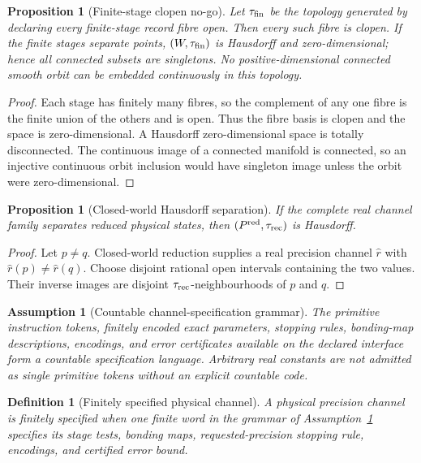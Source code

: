 \documentclass[11pt]{article}
\newtheorem{proposition}[theorem]{Proposition}
\newtheorem{definition}[theorem]{Definition}
\newtheorem{assumption}[theorem]{Assumption}
\theoremstyle{remark}
\begin{document}
\begin{proposition}[Finite-stage clopen no-go]
\label{prop:finite-stage-clopen-no-go}
Let $\tau_{\rm fin}$ be the topology generated by declaring every finite-stage
record fibre open.  Then every such fibre is clopen.  If the finite stages
separate points, $(W,\tau_{\rm fin})$ is Hausdorff and zero-dimensional; hence
all connected subsets are singletons.  No positive-dimensional connected
smooth orbit can be embedded continuously in this topology.
\end{proposition}

\begin{proof}
Each stage has finitely many fibres, so the complement of any one fibre is the
finite union of the others and is open.  Thus the fibre basis is clopen and the
space is zero-dimensional.  A Hausdorff zero-dimensional space is totally
disconnected.  The continuous image of a connected manifold is connected, so
an injective continuous orbit inclusion would have singleton image unless the
orbit were zero-dimensional.
\end{proof}

\begin{proposition}[Closed-world Hausdorff separation]
\label{prop:closed-world-hausdorff}
If the complete real channel family separates reduced physical states, then
$(P^{\rm red},\tau_{\rm rec})$ is Hausdorff.
\end{proposition}

\begin{proof}
Let $p\neq q$.  Closed-world reduction supplies a real precision channel
$\widehat r$ with $\widehat r(p)\neq\widehat r(q)$.  Choose disjoint rational
open intervals containing the two values.  Their inverse images are disjoint
$\tau_{\rm rec}$-neighbourhoods of $p$ and $q$.
\end{proof}

\begin{assumption}[Countable channel-specification grammar]
\label{ass:countable-channel-grammar}
The primitive instruction tokens, finitely encoded exact parameters, stopping
rules, bonding-map descriptions, encodings, and error certificates available
on the declared interface form a countable specification language.  Arbitrary
real constants are not admitted as single primitive tokens without an explicit
countable code.
\end{assumption}

\begin{definition}[Finitely specified physical channel]
\label{def:countable-refinement-protocol}
A physical precision channel is \emph{finitely specified} when one finite word
in the grammar of Assumption~\ref{ass:countable-channel-grammar} specifies its
stage tests, bonding maps, requested-precision stopping rule, encodings, and
certified error bound.
\end{definition}
\end{document}
